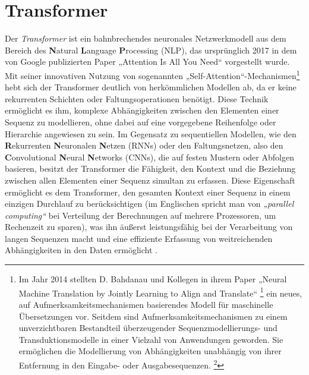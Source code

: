 \chapter*{Transformer}\label{sec:transformer}

Der \emph{Transformer} ist ein bahnbrechendes neuronales Netzwerkmodell aus dem Bereich des \textbf{N}atural \textbf{L}anguage \textbf{P}rocessing (NLP), das ursprünglich 2017 in dem von Google publizierten Paper „Attention Is All You Need“ \cite{Attention_is_all_you_need} vorgestellt wurde. Mit seiner innovativen Nutzung von sogenannten „Self-Attention“-Mechanismen\footnote{Im Jahr 2014 stellten D. Bahdanau und Kollegen in ihrem Paper „Neural Machine Translation by Jointly Learning to Align and Translate“ \footcite{Neural_machine_translation_by_jointly_learning_to_align_and_translate} ein neues, auf Aufmerksamkeitsmechanismen basierendes Modell für maschinelle Übersetzungen vor. Seitdem sind Aufmerksamkeitsmechanismen zu einem unverzichtbaren Bestandteil überzeugender Sequenzmodellierungs- und Transduktionsmodelle in einer Vielzahl von Anwendungen geworden. Sie ermöglichen die Modellierung von Abhängigkeiten unabhängig von ihrer Entfernung in den Eingabe- oder Ausgabesequenzen. \footcites{Attention_is_all_you_need}{Structured_attention_networks}} hebt sich der Transformer deutlich von herkömmlichen Modellen ab, da er keine rekurrenten Schichten oder Faltungsoperationen benötigt. Diese Technik ermöglicht es ihm, komplexe Abhängigkeiten zwischen den Elementen einer Sequenz zu modellieren, ohne dabei auf eine vorgegebene Reihenfolge oder Hierarchie angewiesen zu sein. Im Gegensatz zu sequentiellen Modellen, wie den \textbf{R}ekurrenten \textbf{N}euronalen \textbf{N}etzen (RNNs) oder den Faltungsnetzen, also den \textbf{C}onvolutional \textbf{N}eural \textbf{N}etworks (CNNs), die auf festen Mustern oder Abfolgen basieren, besitzt der Transformer die Fähigkeit, den Kontext und die Beziehung zwischen allen Elementen einer Sequenz simultan zu erfassen. Diese Eigenschaft ermöglicht es dem Transformer, den gesamten Kontext einer Sequenz in einem einzigen Durchlauf zu berücksichtigen (im Englischen spricht man von \emph{„parallel computing“} bei Verteilung der Berechnungen auf mehrere Prozessoren, um Rechenzeit zu sparen), was ihn äußerst leistungsfähig bei der Verarbeitung von langen Sequenzen macht und eine effiziente Erfassung von weitreichenden Abhängigkeiten in den Daten ermöglicht \cite{Deep_Learning_AD_Time_Series_Data}. 

